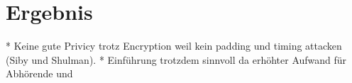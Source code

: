 \chapter{Ergebnis}
\lipsum

\begin{draft}
\begin{markdown}
* Keine gute Privicy trotz Encryption weil kein padding und timing attacken (Siby und Shulman). 
* Einführung trotzdem sinnvoll da erhöhter Aufwand für Abhörende und 
\end{markdown}
\end{draft}